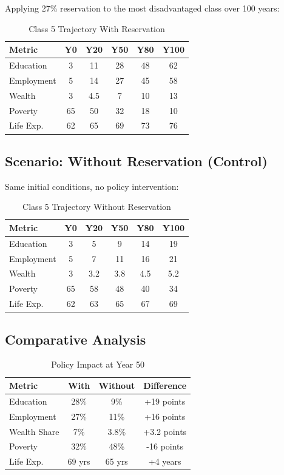 \documentclass[10pt,twocolumn]{article}
\begin{document}
Applying 27\% reservation to the most disadvantaged class over 100 years:

\begin{table}[H]
\centering
\caption{Class 5 Trajectory With Reservation}
\begin{tabular}{lccccc}
\toprule
\textbf{Metric} & \textbf{Y0} & \textbf{Y20} & \textbf{Y50} & \textbf{Y80} & \textbf{Y100} \\
\midrule
Education & 3 & 11 & 28 & 48 & 62 \\
Employment & 5 & 14 & 27 & 45 & 58 \\
Wealth & 3 & 4.5 & 7 & 10 & 13 \\
Poverty & 65 & 50 & 32 & 18 & 10 \\
Life Exp. & 62 & 65 & 69 & 73 & 76 \\
\bottomrule
\end{tabular}
\end{table}

\subsection{Scenario: Without Reservation (Control)}

Same initial conditions, no policy intervention:

\begin{table}[H]
\centering
\caption{Class 5 Trajectory Without Reservation}
\begin{tabular}{lccccc}
\toprule
\textbf{Metric} & \textbf{Y0} & \textbf{Y20} & \textbf{Y50} & \textbf{Y80} & \textbf{Y100} \\
\midrule
Education & 3 & 5 & 9 & 14 & 19 \\
Employment & 5 & 7 & 11 & 16 & 21 \\
Wealth & 3 & 3.2 & 3.8 & 4.5 & 5.2 \\
Poverty & 65 & 58 & 48 & 40 & 34 \\
Life Exp. & 62 & 63 & 65 & 67 & 69 \\
\bottomrule
\end{tabular}
\end{table}

\subsection{Comparative Analysis}

\begin{table}[H]
\centering
\caption{Policy Impact at Year 50}
\begin{tabular}{lccc}
\toprule
\textbf{Metric} & \textbf{With} & \textbf{Without} & \textbf{Difference} \\
\midrule
Education & 28\% & 9\% & +19 points \\
Employment & 27\% & 11\% & +16 points \\
Wealth Share & 7\% & 3.8\% & +3.2 points \\
Poverty & 32\% & 48\% & -16 points \\
Life Exp. & 69 yrs & 65 yrs & +4 years \\
\bottomrule
\end{tabular}
\end{table}
\end{document}
